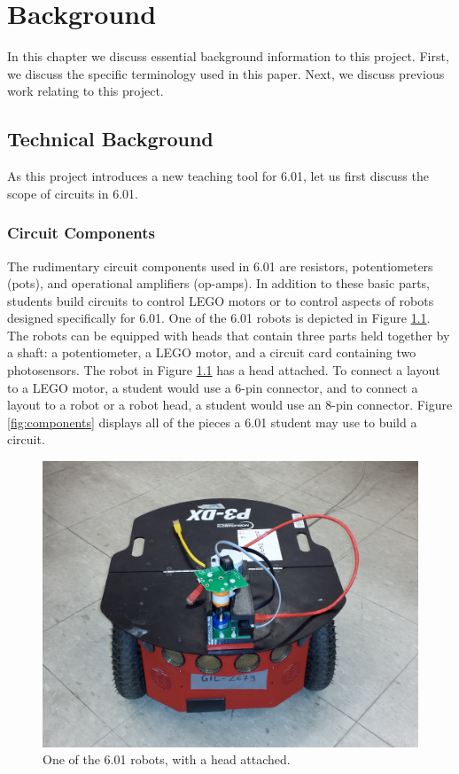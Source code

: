 
\chapter{Background}
\label{ch:background}

In this chapter we discuss essential background information to this project.
First, we discuss the specific terminology used in this paper. Next, we discuss
previous work relating to this project.

\section{Technical Background}

As this project introduces a new teaching tool for 6.01,
let us first discuss the scope of circuits in 6.01.

\subsection{Circuit Components}

The rudimentary circuit components used in 6.01 are resistors, potentiometers
(pots), and operational amplifiers (op-amps). In addition to these basic
parts, students build circuits to control LEGO motors or to control
aspects of robots designed specifically for 6.01. One of the 6.01 robots is
depicted in Figure \ref{fig:robot}. The robots can be equipped with heads that
contain three parts held together by a shaft: a potentiometer, a LEGO motor, and
a circuit card containing two photosensors. The robot in Figure \ref{fig:robot}
has a
head attached. To connect a layout to a LEGO motor, a student would use a 6-pin
connector, and to connect a layout to a robot or a robot head, a student would
use an 8-pin connector. Figure \ref{fig:components} displays all of the
pieces a 6.01 student may use to build a circuit.

\begin{figure}
\begin{center}
\includegraphics[width=\textwidth]{Images/robot.jpeg}
\caption[6.01 robot]{One of the 6.01 robots, with a head attached.}
\label{fig:robot}
\end{center}
\end{figure}

